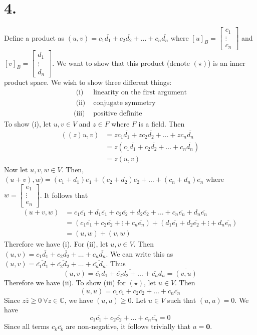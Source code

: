 \documentclass{article}
\begin{document}
\section*{4.}
Define a product as $(u,v) = c_1\overline{d_1} + c_2\overline{d_2} + ... + c_n\overline{d_n}$ where $[u]_B = \begin{bmatrix}c_1\\ \vdots \\c_n\end{bmatrix}$ and $[v]_B = \begin{bmatrix}d_1\\ \vdots \\d_n\end{bmatrix}$. We want to show that this product (denote $(\star)$) is an inner product space. We wish to show three different things:
\begin{align*}
\text{  (i)} &  \text{   linearity on the first argument}\\
\text{ (ii)} & \text{   conjugate symmetry}\\
\text{(iii)} & \text{   positive definite}
\end{align*}
To show (i), let $u,v \in V$ and $z \in F$ where $F$ is a field. Then 
\begin{align*}
((z)u,v)&=zc_1\overline{d_1} + zc_2\overline{d_2} + \dots + zc_n\overline{d_n}\\
&=z(c_1\overline{d_1} + c_2\overline{d_2} + \dots + c_n\overline{d_n})\\
&=z(u,v)
\end{align*}
Now let $u,v,w \in V$. Then, $(u+v),w) = (c_1+d_1)\overline{e_1} + (c_2+d_2)\overline{e_2} +\dots + (c_n+d_n)\overline{e_n}$ where $w = \begin{bmatrix}e_1\\ \vdots \\e_n\end{bmatrix}$. It follows that
\begin{align*}
(u+v, w) & = c_1\overline{e_1}+d_1\overline{e_1} + c_2\overline{e_2}+d_2\overline{e_2} + \dots + c_n\overline{e_n}+d_n\overline{e_n}\\
& = (c_1\overline{e_1} + c_2\overline{e_2} + \vdots + c_n\overline{e_n}) + (d_1\overline{e_1} + d_2\overline{e_2} + \vdots + d_n\overline{e_n})  \\
& = (u,w) + (v,w)
\end{align*}
Therefore we have (i). For (ii), let $u,v \in V$. Then $(u,v) = c_1\overline{d_1} + c_2\overline{d_2} + \dots + c_n\overline{d_n}$. We can write this as $(u,v) = \overline{\overline{c_1}d_1} + \overline{\overline{c_2}d_2} + \dots + \overline{\overline{c_n}d_n}$. Thus 
\[ (u,v) = \overline{\overline{c_1}d_1 +\overline{c_2}d_2+ \dots +\overline{c_n}d_n} = \overline{(v,u)} \] Therefore we have (ii). To show (iii) for $(\star)$, let $u \in V$. Then
\[ (u,u) = c_1\overline{c_1} +  c_2\overline{c_2} + \dots +  c_n\overline{c_n}\] Since $z\overline{z} \geqslant 0 \ \forall z \in \mathbb{C}$, we have $(u,u) \geqslant 0$. Let $u \in V$ such that $(u,u) = 0$. We have
\[c_1\overline{c_1} +  c_2\overline{c_2} + \dots +  c_n\overline{c_n} = 0\] Since all terms $c_k\overline{c_k}$ are non-negative, it follows trivially that $u = \mathbf{0}$.
\end{document}
